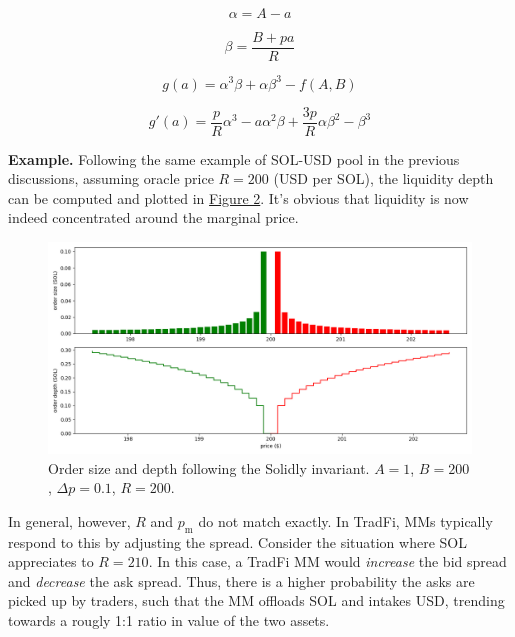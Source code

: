\documentclass{article}
\begin{document}
\begin{equation}
  \alpha = A - a
\end{equation}

\begin{equation}
  \beta = \frac{B + p a}{R}
\end{equation}

\begin{equation}
  g(a) = \alpha^3 \beta + \alpha \beta^3 - f(A, B)
\end{equation}

\begin{equation}
  g'(a) = \frac{p}{R} \alpha^3 - a \alpha^2 \beta + \frac{3p}{R} \alpha \beta^2 - \beta^3
\end{equation}

\textbf{Example.} Following the same example of SOL-USD pool in the previous discussions, assuming oracle price $R = 200$ (USD per SOL), the liquidity depth can be computed and plotted in \hyperref[fig:2]{Figure 2}. It's obvious that liquidity is now indeed concentrated around the marginal price.

\begin{figure}
  \includegraphics[width=\textwidth]{2-solidly.png}
  \caption{Order size and depth following the Solidly invariant. $A = 1$, $B = 200$, $\Delta p = 0.1$, $R = 200$.}
  \label{fig:2}
\end{figure}

In general, however, $R$ and $p_{\mathrm{m}}$ do not match exactly. In TradFi, MMs typically respond to this by adjusting the spread.\supercite{avellanedastoikov} Consider the situation where SOL appreciates to $R = 210$. In this case, a TradFi MM would \textit{increase} the bid spread and \textit{decrease} the ask spread. Thus, there is a higher probability the asks are picked up by traders, such that the MM offloads SOL and intakes USD, trending towards a rougly 1:1 ratio in value of the two assets.
\end{document}
